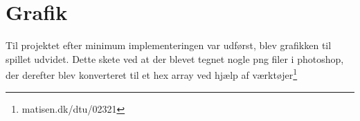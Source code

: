 \section{Grafik}
Til projektet efter minimum implementeringen var udførst, blev grafikken til spillet udvidet. Dette skete ved at der blevet tegnet nogle png filer i photoshop, der derefter blev konverteret til et hex array ved hjælp af værktøjer\footnote{matisen.dk/dtu/02321}